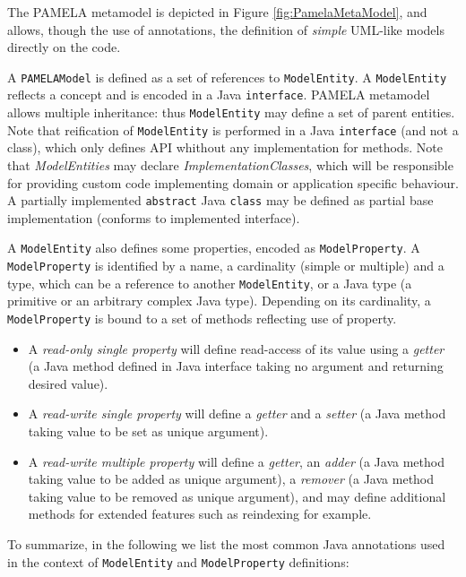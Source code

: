The PAMELA metamodel is depicted in Figure  \ref{fig:PamelaMetaModel}, and allows, though the use of annotations, the definition of \emph{simple} UML-like models directly on the code.

A \texttt{PAMELAModel} is defined as a set of references to \texttt{ModelEntity}. A \texttt{ModelEntity} reflects a concept and is encoded in a Java \texttt{interface}. PAMELA metamodel allows multiple inheritance: thus \texttt{ModelEntity} may define a set of parent entities. Note that reification of \texttt{ModelEntity} is performed in a Java \texttt{interface} (and not a class), which only defines API whithout any implementation for methods. 
Note that \emph{ModelEntities} may declare \emph{ImplementationClasses}, which will be responsible for providing custom code implementing domain or application specific behaviour. A partially implemented \texttt{abstract} Java \texttt{class} may be defined as partial base implementation (conforms to implemented interface).

A \texttt{ModelEntity} also defines some properties, encoded as \texttt{ModelProperty}. A \texttt{ModelProperty} is identified by a name, a cardinality (simple or multiple) and a type, which can be a reference to another \texttt{ModelEntity}, or a Java type (a primitive or an arbitrary complex Java type). Depending on its cardinality, a \texttt{ModelProperty} is bound to a set of methods reflecting use of property.
\begin{itemize}
    \item A \emph{read-only single property} will define read-access of its value using a \emph{getter} (a Java method defined in Java interface taking no argument and returning desired value).
    \item A \emph{read-write single property} will define a \emph{getter} and a \emph{setter} (a Java method taking value to be set as unique argument).
    \item A \emph{read-write multiple property} will define a \emph{getter}, an \emph{adder} (a Java method taking value to be added as unique argument), a \emph{remover} (a Java method taking value to be removed as unique argument), and may define additional methods for extended features such as reindexing for example.
\end{itemize}


To summarize, in the following we list the most common Java annotations used in the context of \texttt{ModelEntity} and \texttt{ModelProperty} definitions:

